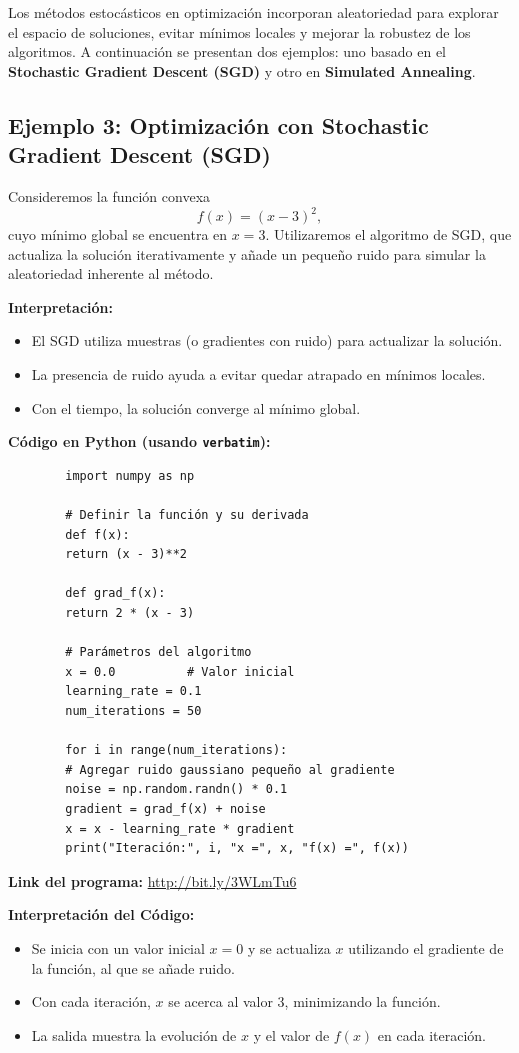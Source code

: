 \documentclass[12pt,a4,oneside]{book}
\begin{document}
	Los métodos estocásticos en optimización incorporan aleatoriedad para explorar el espacio de soluciones, evitar mínimos locales y mejorar la robustez de los algoritmos. A continuación se presentan dos ejemplos: uno basado en el \textbf{Stochastic Gradient Descent (SGD)} y otro en \textbf{Simulated Annealing}.
	
	\subsection{Ejemplo 3: Optimización con Stochastic Gradient Descent (SGD)}
	
	Consideremos la función convexa
	\[
	f(x) = (x-3)^2,
	\]
	cuyo mínimo global se encuentra en \( x=3 \). Utilizaremos el algoritmo de SGD, que actualiza la solución iterativamente y añade un pequeño ruido para simular la aleatoriedad inherente al método.
	
	\textbf{Interpretación:}  
	\begin{itemize}
		\item El SGD utiliza muestras (o gradientes con ruido) para actualizar la solución.
		\item La presencia de ruido ayuda a evitar quedar atrapado en mínimos locales.
		\item Con el tiempo, la solución converge al mínimo global.
	\end{itemize}
	
	\textbf{Código en Python (usando \texttt{verbatim}):}
	\begin{verbatim}
		import numpy as np
		
		# Definir la función y su derivada
		def f(x):
		return (x - 3)**2
		
		def grad_f(x):
		return 2 * (x - 3)
		
		# Parámetros del algoritmo
		x = 0.0          # Valor inicial
		learning_rate = 0.1
		num_iterations = 50
		
		for i in range(num_iterations):
		# Agregar ruido gaussiano pequeño al gradiente
		noise = np.random.randn() * 0.1
		gradient = grad_f(x) + noise
		x = x - learning_rate * gradient
		print("Iteración:", i, "x =", x, "f(x) =", f(x))
	\end{verbatim}
	
	\textbf{Link del programa:} \url{http://bit.ly/3WLmTu6}
	
	\textbf{Interpretación del Código:}  
	\begin{itemize}
		\item Se inicia con un valor inicial \(x=0\) y se actualiza \(x\) utilizando el gradiente de la función, al que se añade ruido.
		\item Con cada iteración, \(x\) se acerca al valor 3, minimizando la función.
		\item La salida muestra la evolución de \(x\) y el valor de \(f(x)\) en cada iteración.
	\end{itemize}
	
\end{document}
